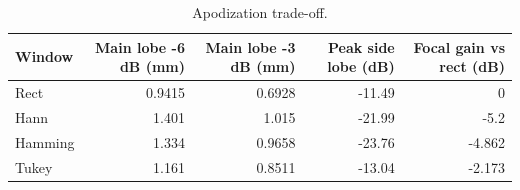 \begin{table}
\caption{Apodization trade-off.}
\label{tab:T_S5_apodization}
\begin{tabular}{lrrrr}
\toprule
Window & Main lobe -6 dB (mm) & Main lobe -3 dB (mm) & Peak side lobe (dB) & Focal gain vs rect (dB) \\
\midrule
Rect & 0.9415 & 0.6928 & -11.49 & 0 \\
Hann & 1.401 & 1.015 & -21.99 & -5.2 \\
Hamming & 1.334 & 0.9658 & -23.76 & -4.862 \\
Tukey & 1.161 & 0.8511 & -13.04 & -2.173 \\
\bottomrule
\end{tabular}
\end{table}
